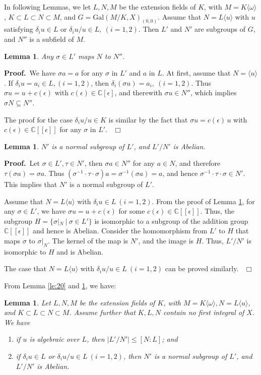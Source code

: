 \documentclass[preprint, 12pt]{elsarticle}
\newtheorem{lem}[thm]{Lemma}
\numberwithin{equation}{section}
\newenvironment{proof}[1][Proof]{\textbf{#1.}\ }{\ $\Box$}
\newcommand{\Comp}{\mathbb{C}}
\newcommand{\Gal}{\mathrm{Gal}}
\begin{document}
In following Lemmas, we let $L,N,M$ be the extension fields of $K$, with
$M = K\langle \omega\rangle $, $K\subset L\subset N \subset M$,
and $G = \Gal(M/K,X)_{(0,0)}$. Assume that $N = L\langle u\rangle
$ with $u$ satisfying $\delta_i u\in L$ or $\delta_iu/u\in L,\ (i
=1,2)$. Then $L'$ and $N'$ are subgroups of $G$, and $N''$ is a
subfield of $M$.
\begin{lem}
\label{le:13} Any $\sigma\in L'$ maps $N$ to $N''$.
\end{lem}
\begin{proof}We have $\sigma a = a$ for any $\sigma$ in $L'$ and $a$ in $L$. At first, assume that $N=\langle u\rangle$. If $\delta_iu = a_i\in L, (i = 1,2)$, then $\delta_i (\sigma
u) = a_i,\ (i =1,2)$. Thus $\sigma u = u + c(\epsilon) $ with
$c(\epsilon)\in \Comp[\epsilon]$, and therewith $\sigma u\in N''$,
which implies $\sigma N \subseteq N''$. 

The proof for the
case $\delta_i u/u \in K$ is similar by the fact that $\sigma u =
c(\epsilon)\,u$ with $c(\epsilon)\in \Comp[[\epsilon]]$ for any
$\sigma$ in $L'$.
\end{proof}
\begin{lem}
\label{le:14} $N'$ is a normal subgroup of $L'$, and $L'/N'$ is Abelian.
\end{lem}
\begin{proof}Let $\sigma\in L', \tau\in N'$, then $\sigma a \in
N''$ for any $a\in N$, and therefore $\tau (\sigma a) = \sigma a$.
Thus $(\sigma^{-1}\cdot \tau\cdot \sigma) a = \sigma^{-1} (\sigma
a) = a$, and hence $\sigma^{-1}\cdot \tau\cdot \sigma\in N'$. This
implies that $N'$ is a normal subgroup of $L'$.

Assume that $N = L\langle u\rangle$ with $\delta_iu\in L\
(i=1,2)$.  From the proof of Lemma \ref{le:13}, for any $\sigma\in
L'$, we have $\sigma u = u + c(\epsilon)$ for some $c(\epsilon)\in
\Comp[[\epsilon]]$. Thus, the subgroup $H = \{\sigma|_N\ |\ \sigma\in L'\}$ is
isomorphic to a subgroup of the addition group $\Comp[[\epsilon]]$
and hence is Abelian. Consider the homomorphism from $L'$ to
$H$ that maps $\sigma$ to $\sigma|_N$. The kernel of the map is
$N'$, and the image is $H$. Thus, $L'/N'$ is isomorphic to $H$ and
is Abelian.

The case that $N = L\langle u\rangle$ with $\delta_iu/u\in L\
(i=1,2)$ can be proved similarly.
\end{proof}

From Lemma \ref{le:20} and \ref{le:14}, we have:
\begin{lem}
\label{le:31} Let $L,N,M$ be the extension fields of $K$, with $M =
K\langle \omega\rangle , N = L\langle u\rangle $, and $K\subset
L\subset N \subset M$. Assume
further that $K, L, N$ contain no first integral of $X$. We have
\begin{enumerate}
    \item[(1).] if $u$ is algebraic over $L$, then $|L'/N'|\leq [N:L]$; and
    \item[(2).] if $\delta_i u \in L$ or $\delta_i u/u\in L\ (i = 1,2)$,
    then ${N'}$ is a normal subgroup of ${L'}$, and $L'/N'$ is
    Abelian.
\end{enumerate}
\end{lem}
\end{document}
